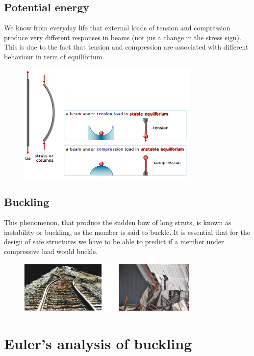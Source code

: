 \documentclass[class=report, crop=false, 12pt,a4paper]{standalone}
\begin{document}
\subsection*{Potential energy}
We know from everyday life that external loads of tension and compression produce very different responses in beams (not jus a change in the stress sign). This is due to the fact that tension and compression are associated with different behaviour in term of equilibrium.
\begin{figure}[H]
    \centering
    \includegraphics[width = 0.8\textwidth]{../img/diagram22.png}
    \caption{}
\end{figure}
\subsection*{Buckling}
This phenomenon, that produce the sudden bow of long struts, is known as instability or buckling, as the member is said to buckle. It is essential that for the design of safe structures we have to be able to predict if a member under compressive load would buckle.
\begin{figure}[H]
    \centering
    \includegraphics[width = 0.8\textwidth]{../img/diagram23.png}
    \caption{}
\end{figure}
\section{Euler's analysis of buckling}
\end{document}
